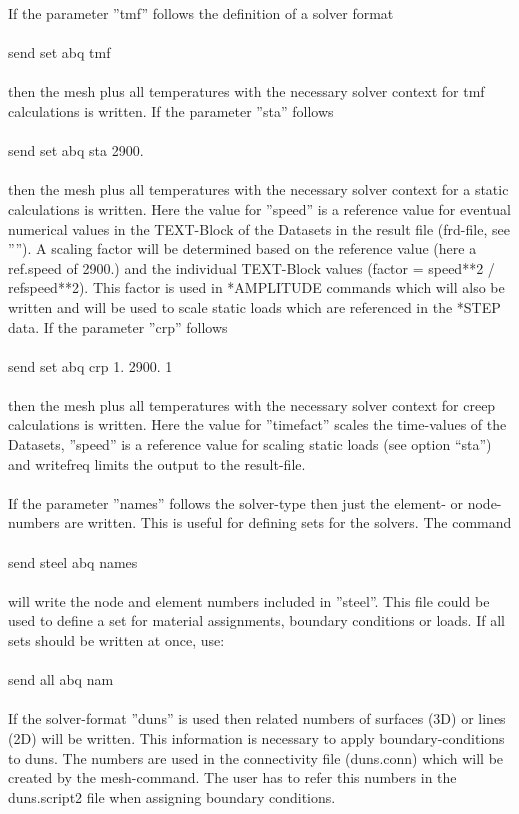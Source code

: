 \documentclass{article}
\begin{document}
If the parameter ''tmf'' follows the definition of a solver format\\\\send set abq tmf\\\\then the mesh plus all temperatures with the necessary solver context for tmf calculations is written. If the parameter ''sta'' follows \\\\send set abq sta 2900.\\\\then the mesh plus all temperatures with the necessary solver context for a static calculations is written. Here the value for ''speed'' is a reference value for eventual numerical values in the TEXT-Block of the Datasets in the result file (frd-file, see ''''). A scaling factor will be determined based on the reference value (here a ref.speed of 2900.) and the individual TEXT-Block values (factor = speed**2 / refspeed**2). This factor is used in *AMPLITUDE commands which will also be written and will be used to scale static loads which are referenced in the *STEP data. If the parameter ''crp'' follows \\\\send set abq crp 1. 2900. 1\\\\then the mesh plus all temperatures with the necessary solver context for creep calculations is written. Here the value for ''timefact'' scales the time-values of the Datasets, ''speed'' is a reference value for scaling static loads (see option ``sta'') and writefreq limits the output to the result-file.\\\\
If the parameter ''names'' follows the solver-type then just the element- or node-numbers are written. This is useful for defining sets for the solvers. The command\\\\send steel abq names\\\\will write the node and element numbers included in ''steel''. This file could be used to define a set for material assignments, boundary conditions or loads. If all sets should be written at once, use:\\\\send all abq nam\\\\
If the solver-format ''duns'' is used then related numbers of surfaces (3D) or lines (2D) will be written. This information is necessary to apply boundary-conditions to duns. The numbers are used in the connectivity file (duns.conn) which will be created by the mesh-command. The user has to refer this numbers in the duns.script2 file when assigning boundary conditions.
\end{document}
